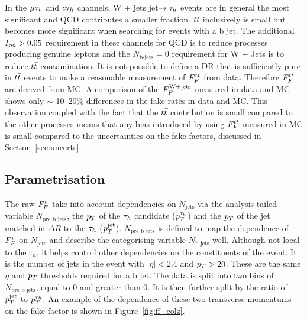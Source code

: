 In the $\mu\tau_{h}$ and $e\tau_{h}$ channels, W + jets jet$\rightarrow\tau_{h}$ events are in general the most significant and QCD contributes a smaller fraction. 
$t\bar{t}$ inclusively is small but becomes more significant when searching for events with a b jet. 
The additional $I_{\text{rel}}>0.05$ requirement in these channels for QCD is to reduce processes producing genuine leptons and the $N_{\text{b-jets}}=0$ requirement for W + Jets is to reduce $t\bar{t}$ contamination.
It is not possible to define a DR that is sufficiently pure in $t\bar{t}$ events to make a reasonable measurement of $F_{F}^{t\bar{t}}$ from data.
Therefore $F_{F}^{t\bar{t}}$ are derived from MC. 
A comparison of the $F_{F}^{\text{W+jets}}$ measured in data and MC shows only $\sim$ 10--20\% differences in the fake rates in data and MC.  
This observation coupled with the fact that the $t\bar{t}$ contribution is small compared to the other processes means that any bias introduced by using $F_{F}^{t\bar{t}}$ measured in MC is small compared to the uncertainties on the fake factors, discussed in Section~\ref{sec:uncerts}. \\


\subsection{Parametrisation}

The raw $F_{F}^{i}$ take into account dependencies on $N_{\text{jets}}$ via the analysis tailed variable $N_{\text{pre b jets}}$, the $p_{T}$ of the $\tau_{h}$ candidate ($p_{T}^{\tau_{h}}$) and the $p_{T}$ of the jet matched in $\Delta R$ to the $\tau_{h}$ ($p_{T}^{\text{jet}}$).
$N_{\text{pre b jets}}$ is defined to map the dependence of $F_{F}^{i}$ on $N_{\text{jets}}$ and describe the categorising variable $N_{\text{b jets}}$ well.
Although not local to the $\tau_h$, it helps control other dependencies on the constituents of the event.
It is the number of jets in the event with $|\eta|<2.4$ and $p_{T}>20$. These are the same $\eta$ and $p_{T}$ thresholds required for a b jet.
The data is split into two bins of $N_{\text{pre b jets}}$, equal to 0 and greater than 0.
It is then further split by the ratio of $p_{T}^{\text{jet}}$ to $p_{T}^{\tau_{h}}$.
An example of the dependence of these two transverse momentums on the fake factor is shown in Figure~\ref{fig:ff_colz}. \\

